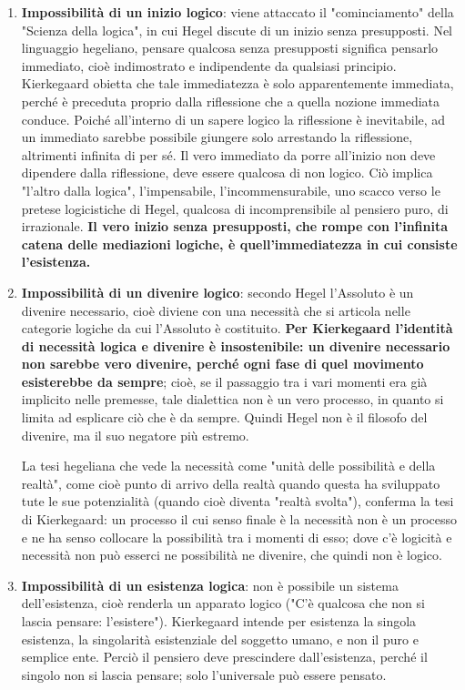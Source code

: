 \begin{enumerate}
	
	\item \textbf{Impossibilità di un inizio logico}: viene attaccato il "cominciamento" della "Scienza della logica", in cui Hegel discute di un inizio senza presupposti. Nel linguaggio hegeliano, pensare qualcosa senza presupposti significa pensarlo immediato, cioè indimostrato e indipendente da qualsiasi principio. Kierkegaard obietta che tale immediatezza è solo apparentemente immediata, perché è preceduta  proprio dalla riflessione che a quella nozione immediata conduce. Poiché all'interno di un sapere logico la riflessione è inevitabile, ad un immediato sarebbe possibile giungere solo arrestando la riflessione, altrimenti infinita di per sé. Il vero immediato da porre all'inizio non deve dipendere dalla riflessione, deve essere qualcosa di non logico. Ciò implica "l'altro dalla logica", l'impensabile, l'incommensurabile, uno scacco verso le pretese logicistiche di Hegel, qualcosa di incomprensibile al pensiero puro, di irrazionale.\textbf{ Il vero inizio senza presupposti, che rompe con l'infinita catena delle mediazioni logiche, è quell'immediatezza in cui consiste l'esistenza.}

	\item \textbf{Impossibilità di un divenire logico}: secondo Hegel l'Assoluto è un divenire necessario, cioè diviene con una necessità che si articola nelle categorie logiche da cui l'Assoluto è costituito. \textbf{Per Kierkegaard l'identità di necessità logica e divenire è insostenibile: un divenire necessario non sarebbe vero divenire, perché ogni fase di quel movimento esisterebbe da sempre}; cioè, se il passaggio tra i vari momenti era già implicito nelle premesse, tale dialettica non è un vero processo, in quanto si limita ad esplicare ciò che è da sempre. Quindi Hegel non è il filosofo del divenire, ma il suo negatore più estremo. 
	
	La tesi hegeliana che vede la necessità come "unità delle possibilità e della realtà", come cioè punto di arrivo della realtà quando questa ha sviluppato tute le sue potenzialità (quando cioè diventa "realtà svolta"), conferma la tesi di Kierkegaard: un processo il cui senso finale è la necessità non è un processo e ne ha senso collocare la possibilità tra i momenti di esso; dove c'è logicità e necessità non può esserci ne possibilità ne divenire, che quindi non è logico.
	
	\item \textbf{Impossibilità di un esistenza logica}: non è possibile un sistema dell'esistenza, cioè renderla un apparato logico ("C'è qualcosa che non si lascia pensare: l'esistere"). Kierkegaard intende per esistenza la singola esistenza, la singolarità esistenziale del soggetto umano, e non il puro e semplice ente. Perciò il pensiero deve prescindere dall'esistenza, perché il singolo non si lascia pensare; solo l'universale può essere pensato.
	
\end{enumerate}

